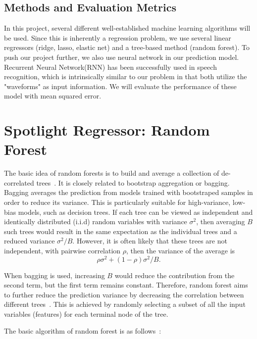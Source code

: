 \documentclass{article} %
\begin{document}
\subsection{Methods and Evaluation Metrics}

In this project, several different well-established machine learning algorithms will be used. Since this is inherently a regression problem, we use several linear regressors (ridge, lasso, elastic net) and a tree-based method (random forest). To push our project further, we also use neural network in our prediction model. Recurrent Neural Network(RNN) has been successfully used in speech recognition, which is intrinsically similar to our problem in that both utilize the "waveforms" as input information.  We will evaluate the performance of these model with mean squared error. 

\section{Spotlight Regressor: Random Forest}

The basic idea of random forests is to build and average a collection of de-correlated trees~\cite{Breiman2001, hastie2008}. It is closely related to bootstrap aggregation or bagging. Bagging averages the prediction from models trained with bootstraped samples in order to reduce its variance. This is particularly suitable for high-variance, low-bias models, such as decision trees. If each tree can be viewed as independent and identically distributed (i.i.d) random variables with variance $\sigma^2$, then averaging $B$ such trees would result in the same expectation as the individual trees and a reduced variance $\sigma^2/B$. However, it is often likely that these trees are not independent, with pairwise correlation $\rho$, then the variance of the average is 
\begin{equation}\label{eq1}
\rho\sigma^2 + (1-\rho)\sigma^2/B. 
\end{equation}

When bagging is used, increasing $B$ would reduce the contribution from the second term, but the first term remains constant. Therefore, random forest aims to further reduce the prediction variance by decreasing the correlation between different trees~\cite{hastie2008}. This is achieved by randomly selecting a subset of all the input variables (features) for each terminal node of the tree.

The basic algorithm of random forest is as follows~\cite{hastie2008}:
\end{document}
